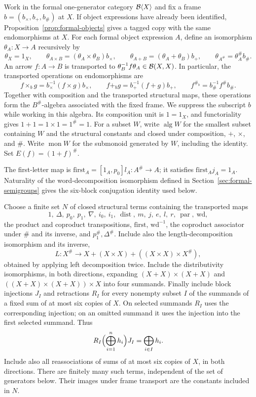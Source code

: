 \documentclass[11pt]{article}
\newcommand{\dist}{\operatorname{dist}}\newcommand{\ass}{\operatorname{ass}}
\begin{document}
Work in the formal one-generator category $\mathcal B\langle X\rangle$ and
fix a frame $b=(b_\times,b_+,b_\#)$ at $X$. If object expressions
have already been identified, Proposition~\ref{prop:formal-objects} gives a tagged copy
with the same endomorphisms at $X$. For each formal object expression
$A$, define an isomorphism $\theta_A:X\to A$ recursively by
\[
\theta_X=1_X,\qquad
\theta_{A\times B}=(\theta_A\times\theta_B)b_\times,\qquad
\theta_{A+B}=(\theta_A+\theta_B)b_+,\qquad
\theta_{A^\#}=\theta_A^\#b_\#.
\]
An arrow $f:A\to B$ is transported to
$\theta_B^{-1}f\theta_A\in\mathcal B(X,X)$. In particular, the
transported operations on endomorphisms are
\[
f\times_b g=b_\times^{-1}(f\times g)b_\times,\qquad
f+_b g=b_+^{-1}(f+g)b_+,\qquad
f^{\#_b}=b_\#^{-1}f^\#b_\#.
\]
Together with composition and the transported structural maps,
these operations form the $B^\#$-algebra associated with the fixed
frame. We suppress the subscript $b$ while working in this algebra.
Its composition unit is $1=1_X$, and functoriality gives
$1+1=1\times1=1^\#=1$. For a subset $W$, write
$\operatorname{alg}W$ for the smallest subset containing $W$ and
the structural constants and closed under composition, $+$,
$\times$, and $\#$. Write $\operatorname{mon}W$ for the submonoid
generated by $W$, including the identity. Set $E(f)=(1+f)^\#$.

The first-letter map is $\mathrm{first}_A=[1_A,p_0]l_A:A^\#\to A$; it satisfies $\mathrm{first}_Aj_A=1_A$. Naturality of the word-decomposition isomorphism defined in Section~\ref{sec:formal-semigroups} gives the six-block conjugation identity used below.

Choose a finite set $N$ of closed structural terms containing the
transported maps
\[
1,\ \Delta,\ p_0,\ p_1,\ \nabla,\ i_0,\ i_1,\ \dist,
\ m,\ j,\ e,\ l,\ r,\ \operatorname{par},\ \mathrm{wd},
\]
the product and coproduct transpositions, $\mathrm{first}$,
$\mathrm{wd}^{-1}$, the coproduct associator under $\#$ and its
inverse, and $p_1^\#,\Delta^\#$. Include also the length-decomposition isomorphism and its inverse,
\[
L:X^\#\longrightarrow X+(X\times X)+((X\times X)\times X^\#),
\]
obtained by applying left decomposition twice. Include the distributivity isomorphisms, in both directions, expanding $(X+X)\times(X+X)$ and $((X+X)\times(X+X))\times X$ into four summands. Finally include block injections $J_I$ and retractions $R_I$ for every nonempty subset $I$ of the summands of a fixed sum of at most six copies of $X$. On selected summands $R_I$ uses the corresponding injection; on an omitted summand it uses the injection into the first selected summand. Thus
\[
R_I\Bigl(\bigoplus_{i=1}^n h_i\Bigr)J_I
=\bigoplus_{i\in I}h_i.
\]
Include also all reassociations of sums of at most six copies of $X$, in both directions. There are finitely many such terms, independent of the set of generators below. Their images under frame transport are the constants included in $N$.
\end{document}
